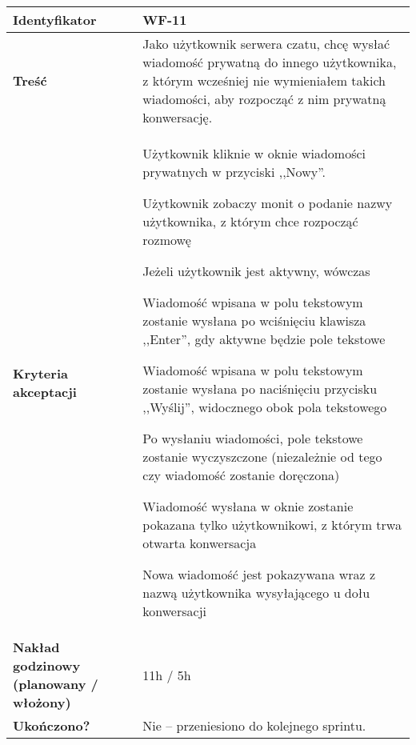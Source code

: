 \begin{tabular}{ | l | l | }
	\hline
		\textbf{Identyfikator} &
		WF-11
		\\

	\hline
		\textbf{Treść} & \parbox[t]{11.5cm}{\strut
			Jako użytkownik serwera czatu, chcę wysłać wiadomość
			prywatną do innego użytkownika, z którym wcześniej nie
			wymieniałem takich wiadomości, aby rozpocząć z nim
			prywatną konwersację.
		\strut}\\

	\hline
		\parbox[t]{4cm}{\textbf{Kryteria akceptacji}} & \parbox[t]{11.5cm}{\strut
			\begin{enumreq}
				\item Użytkownik kliknie w oknie wiadomości
				prywatnych w przyciski ,,Nowy''.
				\item Użytkownik zobaczy monit o podanie nazwy
				użytkownika, z którym chce rozpocząć rozmowę
				\item Jeżeli użytkownik jest aktywny, wówczas
				\item Wiadomość wpisana w polu tekstowym zostanie
				wysłana po wciśnięciu klawisza ,,Enter'', gdy
				aktywne
				będzie pole tekstowe
				\item Wiadomość wpisana w polu tekstowym zostanie
				wysłana po naciśnięciu przycisku ,,Wyślij'',
				widocznego obok pola tekstowego
				\item Po wysłaniu wiadomości, pole tekstowe zostanie
				wyczyszczone (niezależnie od tego czy wiadomość
				zostanie doręczona)
				\item Wiadomość wysłana w oknie zostanie pokazana
				tylko użytkownikowi, z którym trwa otwarta
				konwersacja
				\item Nowa wiadomość jest pokazywana wraz z nazwą
				użytkownika wysyłającego u dołu konwersacji
			\end{enumreq}
			\strut}
		\\
    \hline
      \parbox[t]{4cm}{\textbf{Nakład godzinowy (planowany / włożony)}} &
      \parbox[t]{11.5cm}{\strut
        11h / 5h
      \strut}\\

      \hline
        \parbox[t]{4cm}{\textbf{Ukończono?}} &
        \parbox[t]{11.5cm}{\strut
          Nie -- przeniesiono do kolejnego sprintu.
        \strut}\\

	\hline
\end{tabular}

\vspace{1em}

